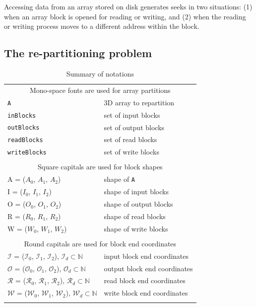 \documentclass[sigconf, nonacm]{acmart}
\begin{document}
Accessing data from an array stored on disk generates seeks in two
situations: (1) when an array block is opened for reading or writing, and
(2) when the reading or writing process moves to a different address within
the block.

\subsection{The re-partitioning problem}
\begin{table}
  \begin{tabular}{ll}
    \multicolumn{2}{c}{\cellcolor{black!25}Mono-space fonts are used for array partitions}\\
    \texttt{A} & 3D array to repartition \\
    \texttt{inBlocks} & set of input blocks \\
    \texttt{outBlocks} & set of output blocks \\
    \texttt{readBlocks} & set of read blocks \\
    \texttt{writeBlocks} & set of write blocks \\

    &\\
    \multicolumn{2}{c}{\cellcolor{black!25}Square capitals are used for block shapes}\\
    A = ($A_0$, $A_1$, $A_2$) & shape of \texttt{A}\\
    I = ($I_0$, $I_1$, $I_2$)& shape of input blocks\\
    O = ($O_0$, $O_1$, $O_2$) & shape of output blocks\\
    R = ($R_0$, $R_1$, $R_2$) & shape of read blocks\\
    W = ($W_0$, $W_1$, $W_2$) & shape of write blocks\\
    &\\
    \multicolumn{2}{c}{\cellcolor{black!25}Round capitals are used for block end coordinates}\\

    $\mathcal{I}$ = ($\mathcal{I}_0$, $\mathcal{I}_1$, $\mathcal{I}_2$), \enskip $\mathcal{I}_d \subset \mathbb{N} $ & input block end coordinates \\
    $\mathcal{O}$ = ($\mathcal{O}_0$, $\mathcal{O}_1$, $\mathcal{O}_2$), \enskip $\mathcal{O}_d \subset \mathbb{N} $ & output block end coordinates\\
    $\mathcal{R}$ = ($\mathcal{R}_0$, $\mathcal{R}_1$, $\mathcal{R}_2$), \enskip $\mathcal{R}_d \subset \mathbb{N} $ & read block end coordinates\\
    $\mathcal{W}$ = ($\mathcal{W}_0$, $\mathcal{W}_1$, $\mathcal{W}_2$), \enskip $\mathcal{W}_d \subset \mathbb{N} $ & write block end coordinates\\
    &
  \end{tabular}
  \caption{Summary of notations}
  \label{table:notations}
\end{table}
\end{document}
